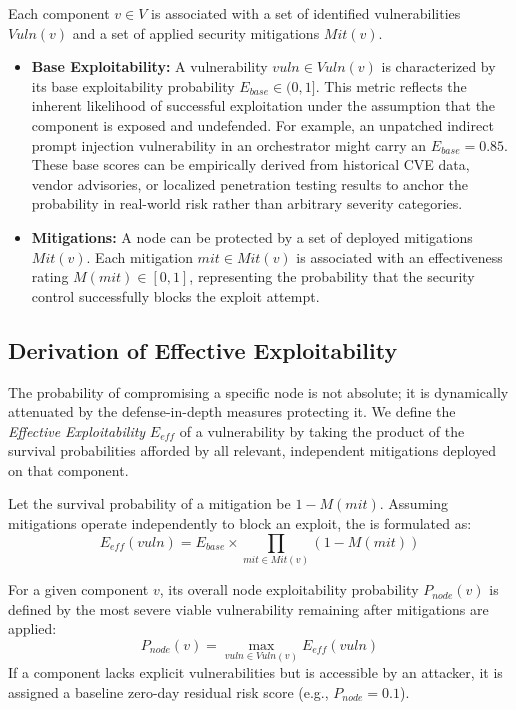 Each component $v \in V$ is associated with a set of identified vulnerabilities $Vuln(v)$ and a set of applied security mitigations $Mit(v)$. 
\begin{itemize}
    \item \textbf{Base Exploitability:} A vulnerability $vuln \in Vuln(v)$ is characterized by its base exploitability probability $E_{base} \in (0, 1]$. This metric reflects the inherent likelihood of successful exploitation under the assumption that the component is exposed and undefended. For example, an unpatched indirect prompt injection vulnerability in an orchestrator might carry an $E_{base} = 0.85$. These base scores can be empirically derived from historical CVE data, vendor advisories, or localized penetration testing results to anchor the probability in real-world risk rather than arbitrary severity categories.
    \item \textbf{Mitigations:} A node can be protected by a set of deployed mitigations $Mit(v)$. Each mitigation $mit \in Mit(v)$ is associated with an effectiveness rating $M(mit) \in [0, 1]$, representing the probability that the security control successfully blocks the exploit attempt.
\end{itemize}

\subsection{Derivation of Effective Exploitability}
The probability of compromising a specific node is not absolute; it is dynamically attenuated by the defense-in-depth measures protecting it. We define the \textit{Effective Exploitability} $E_{eff}$ of a vulnerability by taking the product of the survival probabilities afforded by all relevant, independent mitigations deployed on that component. 

Let the survival probability of a mitigation be $1 - M(mit)$. Assuming mitigations operate independently to block an exploit, the  is formulated as:
\begin{equation}
E_{eff}(vuln) = E_{base} \times \prod_{mit \in Mit(v)} \left(1 - M(mit)\right)
\end{equation}

For a given component $v$, its overall node exploitability probability $P_{node}(v)$ is defined by the most severe viable vulnerability remaining after mitigations are applied:
\begin{equation}
P_{node}(v) = \max_{vuln \in Vuln(v)} E_{eff}(vuln)
\end{equation}
If a component lacks explicit vulnerabilities but is accessible by an attacker, it is assigned a baseline zero-day residual risk score (e.g., $P_{node} = 0.1$).

